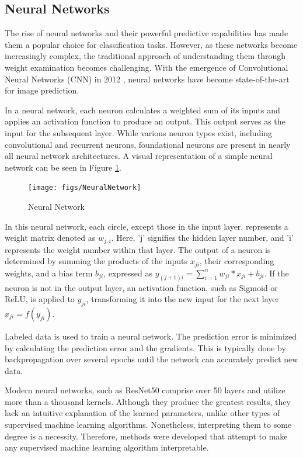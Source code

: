 \subsection{Neural Networks}

The rise of neural networks and their powerful predictive capabilities has made them a popular choice for classification tasks. However, as these networks become increasingly complex, the traditional approach of understanding them through weight examination becomes challenging. With the emergence of Convolutional Neural Networks (CNN) in 2012 \cite{krizhevsky2012nn}, neural networks have become state-of-the-art for image prediction.

In a neural network, each neuron calculates a weighted sum of its inputs and applies an activation function to produce an output. This output serves as the input for the subsequent layer. While various neuron types exist, including convolutional and recurrent neurons, foundational neurons are present in nearly all neural network architectures. A visual representation of a simple neural network can be seen in Figure \ref{fig:Neural_Network}.

\begin{figure}[h!]
	\centering
	\texttt{[image: figs/NeuralNetwork]}
	\caption[Neural Network]{Neural Network} 
	\label{fig:Neural_Network}
\end{figure}

In this neural network, each circle, except those in the input layer, represents a weight matrix denoted as $w_{j,i}$. Here, 'j' signifies the hidden layer number, and 'i' represents the weight number within that layer. The output of a neuron is determined by summing the products of the inputs $x_{ji}$, their corresponding weights, and a bias term $b_{ji}$, expressed as $y_{(j+1)i} = \sum_{i=1}^{n} w_{ji} \ast x_{ji} + b_{ji}$. If the neuron is not in the output layer, an activation function, such as Sigmoid or ReLU, is applied to $y_{ji}$, transforming it into the new input for the next layer $x_{ji} = f(y_{ji})$. 

Labeled data is used to train a neural network. The prediction error is minimized by calculating the prediction error and the gradients. This is typically done by backpropagation over several epochs until the network can accurately predict new data.

Modern neural networks, such as ResNet50 \cite{he2015deep} comprise over 50 layers and utilize more than a thousand kernels. Although they produce the greatest results, they lack an intuitive explanation of the learned parameters, unlike other types of supervised machine learning algorithms. Nonetheless, interpreting them to some degree is a necessity. Therefore, methods were developed that attempt to make any supervised machine learning algorithm interpretable. 

